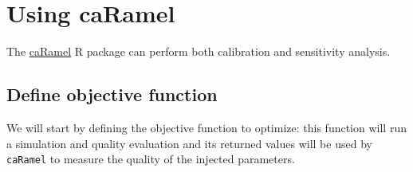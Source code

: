 \documentclass[
]{book}
\begin{document}
\hypertarget{using-caramel}{%
\section{Using caRamel}\label{using-caramel}}

The \href{https://cran.r-project.org/package=caRamel}{caRamel} R package can perform both calibration and sensitivity analysis.

\hypertarget{define-objective-function}{%
\subsection{Define objective function}\label{define-objective-function}}

We will start by defining the objective function to optimize: this function will run a simulation and quality evaluation and its returned values will be used by \texttt{caRamel} to measure the quality of the injected parameters.
\end{document}
